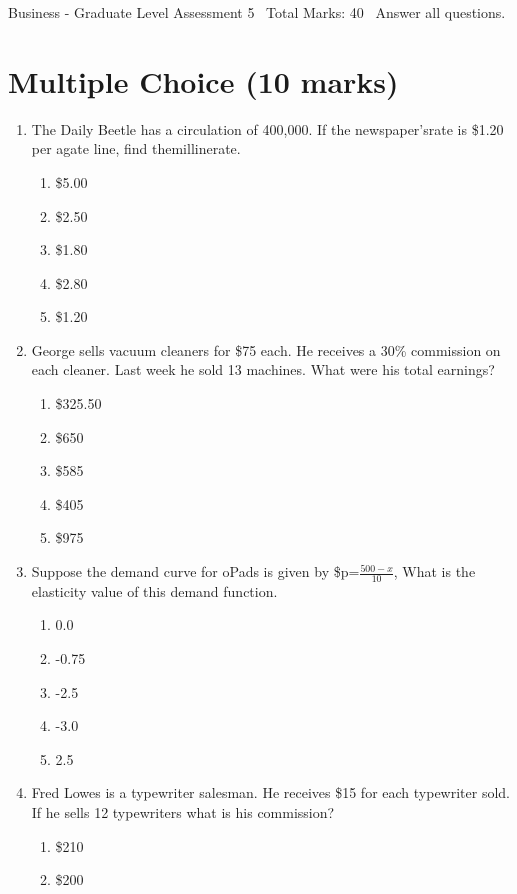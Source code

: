 \documentclass[12pt]{article}
\begin{document}
\begin{center}
Business - Graduate Level Assessment 5 \
Total Marks: 40 \
Answer all questions.
\end{center}

\section*{Multiple Choice (10 marks)}
\begin{enumerate}[label=\arabic*.]
\item The Daily Beetle has a circulation of 400,000. If the newspaper'srate is \$1.20 per agate
line, find themillinerate.
\begin{enumerate}[label=(\alph*)]
    \item \$5.00
    \item \$2.50
    \item \$1.80
    \item \$2.80
    \item \$1.20
\end{enumerate}
\item George sells vacuum cleaners for \$75 each. He receives a 30\% commission on each cleaner.
Last week he sold 13 machines. What were his total earnings?
\begin{enumerate}[label=(\alph*)]
    \item \$325.50
    \item \$650
    \item \$585
    \item \$405
    \item \$975
\end{enumerate}
\item Suppose the demand curve for oPads is given by \$p=\ensuremath{\frac{500-x}{10}}, What is the elasticity
value of this demand function.
\begin{enumerate}[label=(\alph*)]
    \item 0.0
    \item -0.75
    \item -2.5
    \item -3.0
    \item 2.5
\end{enumerate}
\item Fred Lowes is a typewriter salesman. He receives \$15 for each typewriter sold. If he sells
12 typewriters what is his commission?
\begin{enumerate}[label=(\alph*)]
    \item \$210
    \item \$200

\end{enumerate}
\end{enumerate}
\end{document}
